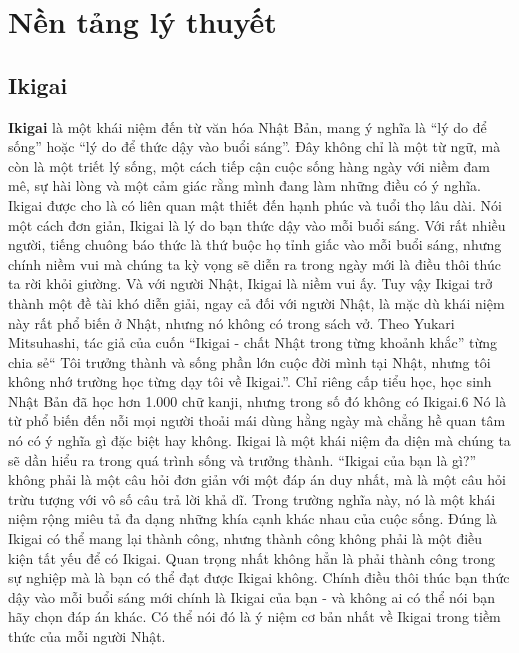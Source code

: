 \section{Nền tảng lý thuyết}
\subsection{Ikigai}
\textbf{Ikigai} là một khái niệm đến từ văn hóa Nhật Bản, mang ý nghĩa là “lý do để sống” hoặc “lý do để thức dậy vào buổi sáng”. Đây không chỉ là một từ ngữ, mà còn là một triết lý sống, một cách tiếp cận cuộc sống hàng ngày với niềm đam mê, sự hài lòng và một cảm giác rằng mình đang làm những điều có ý nghĩa. Ikigai được cho là có liên quan mật thiết đến hạnh phúc và tuổi thọ lâu dài. Nói một cách đơn giản, Ikigai là lý do bạn thức dậy vào mỗi buổi sáng. Với rất nhiều người, tiếng chuông báo thức là thứ buộc họ tỉnh giấc vào mỗi buổi sáng, nhưng chính niềm vui mà chúng ta kỳ vọng sẽ diễn ra trong ngày mới là điều thôi thúc ta rời khỏi giường. Và với người Nhật, Ikigai là niềm vui ấy. Tuy vậy Ikigai trở thành một đề tài khó diễn giải, ngay cả đối với người Nhật, là mặc dù khái niệm này rất phổ biến ở Nhật, nhưng nó không có trong sách vở. Theo Yukari Mitsuhashi, tác giả của cuốn “Ikigai - chất Nhật trong từng khoảnh khắc” từng chia sẻ“ Tôi trưởng thành và sống phần lớn cuộc đời mình tại Nhật, nhưng tôi không nhớ trường học từng dạy tôi về Ikigai.”. Chỉ riêng cấp tiểu học, học sinh Nhật Bản đã học hơn 1.000 chữ kanji, nhưng trong số đó không có Ikigai.6 Nó là từ phổ biến đến nỗi mọi người thoải mái dùng hằng ngày mà chẳng hề quan tâm nó có ý nghĩa gì đặc biệt hay không. Ikigai là một khái niệm đa diện mà chúng ta sẽ dần hiểu ra trong quá trình sống và trưởng thành. “Ikigai của bạn là gì?” không phải là một câu hỏi đơn giản với một đáp án duy nhất, mà là một câu hỏi trừu tượng với vô số câu trả lời khả dĩ. Trong trường nghĩa này, nó là một khái niệm rộng miêu tả đa dạng những khía cạnh khác
nhau của cuộc sống. Đúng là Ikigai có thể mang lại thành công, nhưng thành công
không phải là một điều kiện tất yếu để có Ikigai. Quan trọng nhất không hẳn là phải
thành công trong sự nghiệp mà là bạn có thể đạt được Ikigai không. Chính điều thôi
thúc bạn thức dậy vào mỗi buổi sáng mới chính là Ikigai của bạn - và không ai có thể
nói bạn hãy chọn đáp án khác. Có thể nói đó là ý niệm cơ bản nhất về Ikigai trong tiềm
thức của mỗi người Nhật.

